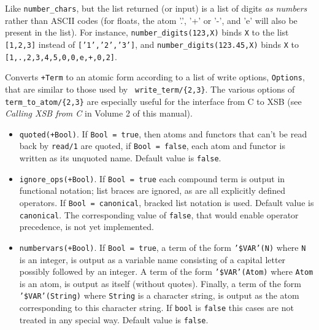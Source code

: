 \begin{description}
    Like \verb|number_chars|, but the list returned (or input) is a list of
    digits \emph{as numbers} rather than ASCII codes (for floats, the atom
    '.', '+' or '-', and 'e' will also be present in the list). For instance, 
    \verb|number_digits(123,X)| binds {\tt X} to the list {\tt [1,2,3]}
    instead of {\tt ['1','2','3']}, and \verb|number_digits(123.45,X)|
    binds {\tt X} to {\tt [1,.,2,3,4,5,0,0,e,+,0,2]}.


%
Converts {\tt +Term} to an atomic form according to a list of write
options, {\tt Options}, that are similar to those used by {\tt
write\_term/\{2,3\}}.  The various options of {\tt
term\_to\_atom/\{2,3\}} are especially useful for the interface from C
to XSB (see {\em Calling XSB from C} in Volume 2 of this manual).
%
\begin{itemize}
%
\item {\tt quoted(+Bool)}.  If {\tt Bool = true}, then atoms and
    functors that can't be read back by {\tt read/1} are quoted, if
    {\tt Bool = false}, each atom and functor is written as its
    unquoted name. Default value is {\tt false}.
%
\item {\tt ignore\_ops(+Bool)}. If {\tt Bool = true} each compound term
is output in functional notation; list braces are ignored, as are all
explicitly defined operators.  If {\tt Bool = canonical}, bracked list
notation is used.  Default value is {\tt canonical}.  The
corresponding value of {\tt false}, that would enable operator
precedence, is not yet implemented.
%
 \item {\tt numbervars(+Bool)}.  If {\tt Bool = true}, a term of the
form {\tt '\$VAR'(N)} where {\tt N} is an integer, is output as a
variable name consisting of a capital letter possibly followed by an
integer.  A term of the form {\tt '\$VAR'(Atom)} where {\tt Atom} is an
atom, is output as itself (without quotes).  Finally, a term of the
form {\tt '\$VAR'(String)} where {\tt String} is a character string, is
output as the atom corresponding to this character string.  If
{\tt bool} is {\tt false} this cases are not treated in any special
way.  Default value is {\tt false}.
%
\end{itemize}


\end{description}
